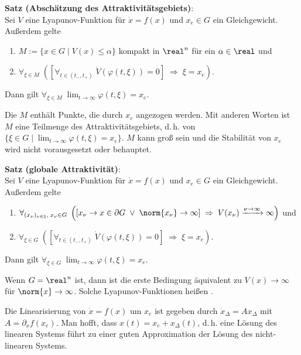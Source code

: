 \linie

\textbf{Satz (Abschätzung des Attraktivitätsgebiets)}:\\
Sei $V$ eine Lyapunov-Funktion für $\dot{x} = f(x)$ und $x_e \in G$ ein Gleichgewicht.
Außerdem gelte
\begin{enumerate}
    \item
    $M := \{x \in G \;|\; V(x) \le \alpha\}$ kompakt in $\real^n$ für ein $\alpha \in \real$ und
    
    \item
    $\forall_{\xi \in M}\;
    ([\forall_{t \in (t_-, t_+)}\; \dot{V}(\varphi(t, \xi)) = 0] \;\Rightarrow\;
    \xi = x_e)$.
\end{enumerate}
Dann gilt $\forall_{\xi \in M}\; \lim_{t \to \infty} \varphi(t, \xi) = x_e$.

Die  $M$ enthält Punkte, die durch $x_e$ angezogen werden.
Mit anderen Worten ist $M$ eine Teilmenge des Attraktivitätsgebiets, d.\,h. von\\
$\{\xi \in G \;|\; \lim_{t \to \infty} \varphi(t, \xi) = x_e\}$.
$M$ kann groß sein und die Stabilität von $x_e$ wird nicht vorausgesetzt oder behauptet.

\linie

\textbf{Satz (globale Attraktivität)}:\\
Sei $V$ eine Lyapunov-Funktion für $\dot{x} = f(x)$ und $x_e \in G$ ein Gleichgewicht.
Außerdem gelte
\begin{enumerate}
    \item
    $\forall_{(x_\nu)_{\nu \in \natural},\; x_\nu \in G}\;
    \left(\left[x_\nu \to x \in \partial G \;\lor\; \norm{x_\nu} \to \infty\right] \;\Rightarrow\;
    V(x_\nu) \xrightarrow{\nu \to \infty} \infty\right)$ und
    
    \item
    $\forall_{\xi \in G}\;
    ([\forall_{t \in (t_-, t_+)}\; \dot{V}(\varphi(t, \xi)) = 0] \;\Rightarrow\;
    \xi = x_e)$.
\end{enumerate}
Dann gilt $\forall_{\xi \in G}\; \lim_{t \to \infty} \varphi(t, \xi) = x_e$.

Wenn $G = \real^n$ ist, dann ist die erste Bedingung äquivalent zu $V(x) \to \infty$
für $\norm{x} \to \infty$.
Solche Lyapunov-Funktionen heißen .

\linie

Die Linearisierung von $\dot{x} = f(x)$ um $x_e$ ist gegeben durch
$\dot{x}_\Delta = Ax_\Delta$ mit $A = \partial_x f(x_e)$.
Man hofft, dass $x(t) = x_e + x_\Delta(t)$, d.\,h. eine Lösung des linearen Systems führt
zu einer guten Approximation der Lösung des nicht-linearen Systems.

